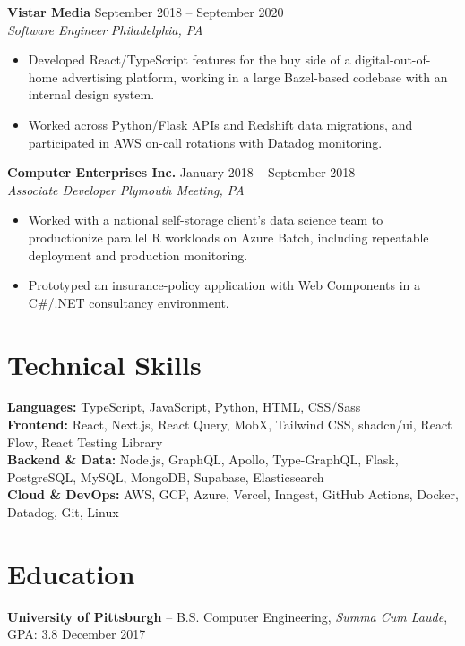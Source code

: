\documentclass[10pt,letterpaper]{article}
\newcommand{\role}[4]{%
  \Needspace{2.5\baselineskip}%
  \textbf{#1} \hfill #2\\[-2pt]
  \textit{#3} \hfill \textit{#4}\\[-4.4pt]
}
\begin{document}
\role{Vistar Media}{September 2018 -- September 2020}{Software Engineer}{Philadelphia, PA}
\begin{itemize}
  \item Developed React/TypeScript features for the buy side of a digital-out-of-home advertising platform, working in a large Bazel-based codebase with an internal design system.
  \item Worked across Python/Flask APIs and Redshift data migrations, and participated in AWS on-call rotations with Datadog monitoring.
\end{itemize}

\role{Computer Enterprises Inc.}{January 2018 -- September 2018}{Associate Developer}{Plymouth Meeting, PA}
\begin{itemize}
  \item Worked with a national self-storage client's data science team to productionize parallel R workloads on Azure Batch, including repeatable deployment and production monitoring.
  \item Prototyped an insurance-policy application with Web Components in a C\#/.NET consultancy environment.
\end{itemize}

\section{Technical Skills}
\small
\textbf{Languages:} TypeScript, JavaScript, Python, HTML, CSS/Sass \\
\textbf{Frontend:} React, Next.js, React Query, MobX, Tailwind CSS, shadcn/ui, React Flow, React Testing Library \\
\textbf{Backend \& Data:} Node.js, GraphQL, Apollo, Type-GraphQL, Flask, PostgreSQL, MySQL, MongoDB, Supabase, Elasticsearch \\
\textbf{Cloud \& DevOps:} AWS, GCP, Azure, Vercel, Inngest, GitHub Actions, Docker, Datadog, Git, Linux
\normalsize

\section{Education}
\small
\textbf{University of Pittsburgh} -- B.S. Computer Engineering, \textit{Summa Cum Laude}, GPA: 3.8 \hfill December 2017
\normalsize
\end{document}
